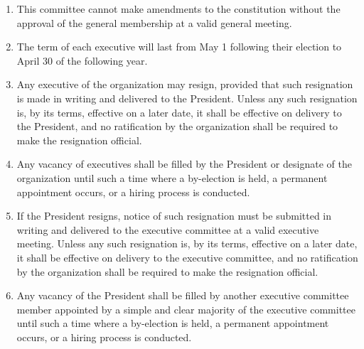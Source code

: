 \documentclass[12pt]{article}
\begin{document}
\begin{enumerate}[{4}.1]
    \item This committee cannot make amendments to the constitution without the approval of the general membership at a valid general meeting. 
    \item The term of each executive will last from May 1 following their election to April 30 of the following year.
    \item Any executive of the organization may resign, provided that such resignation is made in writing and delivered to the President. Unless any such resignation is, by its terms, effective on a later date, it shall be effective on delivery to the President, and no ratification by the organization shall be required to make the resignation official.
    \item Any vacancy of executives shall be filled by the President or designate of the organization until such a time where a by-election is held, a permanent appointment occurs, or a hiring process is conducted. 
    \item	If the President resigns, notice of such resignation must be submitted in writing and delivered to the executive committee at a valid executive meeting. Unless any such resignation is, by its terms, effective on a later date, it shall be effective on delivery to the executive committee, and no ratification by the organization shall be required to make the resignation official.
    \item Any vacancy of the President shall be filled by another executive committee member appointed by a simple and clear majority of the executive committee until such a time where a by-election is held, a permanent appointment occurs, or a hiring process is conducted.
\end{enumerate}


\end{document}
